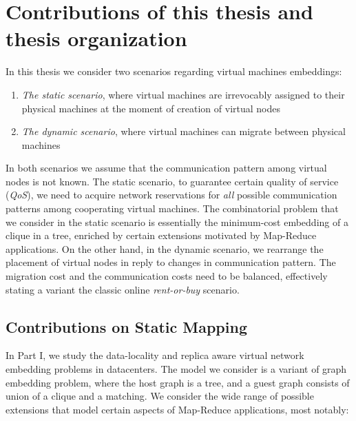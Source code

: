 \section{Contributions of this thesis and thesis organization}

In this thesis we consider two scenarios regarding virtual machines embeddings:
\begin{enumerate}
  \item \emph{The static scenario}, where virtual machines are irrevocably assigned to their physical machines at the moment of creation of virtual nodes
  \item \emph{The dynamic scenario}, where virtual machines can migrate between physical machines
\end{enumerate}

In both scenarios we assume that the communication pattern among virtual nodes is not known.
The static scenario, to guarantee certain quality of service (\emph{QoS}), we need to acquire network reservations for \emph{all} possible communication patterns among cooperating virtual machines.
The combinatorial problem that we consider in the static scenario is essentially the minimum-cost embedding of a clique in a tree, enriched by certain extensions motivated by Map-Reduce applications.
On the other hand, in the dynamic scenario, we rearrange the placement of virtual nodes in reply to changes in communication pattern.
The migration cost and the communication costs need to be balanced, effectively stating a variant the classic online \emph{rent-or-buy} scenario.

\subsection{Contributions on Static Mapping}

In Part I, we study the data-locality and replica aware virtual network embedding problems in datacenters.
The model we consider is a variant of graph embedding problem, where the host graph is a tree, and a guest graph consists of union of a clique and a matching.
We consider the wide range of possible extensions that model certain aspects of Map-Reduce applications, most notably:

